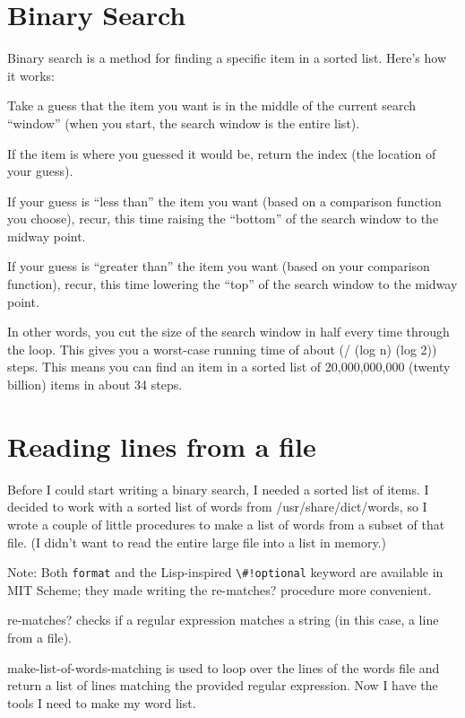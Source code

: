 \documentclass[12pt,openright,draft]{book}
\begin{document}
\section{Binary Search}

Binary search is a method for finding a specific item in a sorted list. Here's how it works:

Take a guess that the item you want is in the middle of the current search ``window'' (when you start, the search window is the entire list). 

If the item is where you guessed it would be, return the index (the location of your guess).

If your guess is ``less than'' the item you want (based on a comparison function you choose), recur, this time raising the ``bottom'' of the search window to the midway point. 

If your guess is ``greater than'' the item you want (based on your comparison function), recur, this time lowering the ``top'' of the search window to the midway point. 

In other words, you cut the size of the search window in half every time through the loop. This gives you a worst-case running time of about (/ (log n) (log 2)) steps. This means you can find an item in a sorted list of 20,000,000,000 (twenty billion) items in about 34 steps. 

\section{Reading lines from a file}

Before I could start writing a binary search, I needed a sorted list of items. I decided to work with a sorted list of words from /usr/share/dict/words, so I wrote a couple of little procedures to make a list of words from a subset of that file. (I didn't want to read the entire large file into a list in memory.) 

Note: Both \verb|format| and the Lisp-inspired \verb|\#!optional|
keyword are available in MIT Scheme; they made writing the re-matches?
procedure more convenient.

re-matches? checks if a regular expression matches a string (in this case, a line from a file).

make-list-of-words-matching is used to loop over the lines of the words file and return a list of lines matching the provided regular expression. 
Now I have the tools I need to make my word list. 
\end{document}

